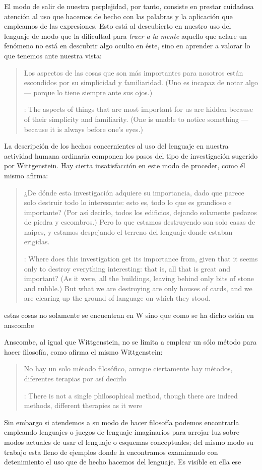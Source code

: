 El modo de salir de nuestra perplejidad, por tanto, consiste en prestar
cuidadosa atención al uso que hacemos de hecho con las palabras y la aplicación
que empleamos de las expresiones. Esto está al descubierto en nuestro uso del
lenguaje de modo que la dificultad para \emph{traer a la mente} aquello que
aclare un fenómeno no está en descubrir algo oculto en éste, sino en aprender a
valorar lo que tenemos ante nuestra vista:
\blockquote[{\cite[\S129]{wittgenstein1953phiinv}}: The aspects of things that
are most important for us are hidden because of their simplicity and
familiarity. (One is unable to notice something --- because it is always before
one's eyes.)]{Los aspectos de las cosas que son más importantes para nosotros
  están escondidos por su simplicidad y familiaridad. (Uno es incapaz de notar
  algo --- porque lo tiene siempre ante sus ojos.)}
La descripción de los hechos concernientes al uso del lenguaje en nuestra
actividad humana ordinaria componen los pasos del tipo de investigación sugerido
por Wittgenstein. Hay cierta insatisfacción en este modo de proceder, como él
mismo afirma:
\blockquote[{\cite[\S118]{wittgenstein1953phiinv}}: Where does this
investigation get its importance from, given that it seems only to destroy
everything interesting: that is, all that is great and important? (As it were,
all the buildings, leaving behind only bits of stone and rubble.) But what we
are destroying are only houses of cards, and we are clearing up the ground of
language on which they stood.]{¿De dónde esta investigación adquiere su
  importancia, dado que parece solo destruir todo lo interesante: esto es, todo
  lo que es grandioso e importante? (Por así decirlo, todos los edificios,
  dejando solamente pedazos de piedra y escombros.) Pero lo que estamos
  destruyendo son solo casas de naipes, y estamos despejando el terreno del
  lenguaje donde estaban erigidas.}


estas cosas no solamente se encuentran en W
sino que como se ha dicho están en anscombe

Anscombe, al igual que Wittgenstein, no se limita a emplear un sólo método para
hacer filosofía, como afirma el mismo Wittgenstein:

\blockquote[{\cite[\S133]{wittgenstein1953phiinv}}: There is not a single
philosophical method, though there are indeed methods, different therapies as it
were]{No hay un solo método filosófico, aunque ciertamente hay métodos,
  diferentes terapias por así decirlo}

Sin embargo si atendemos a su modo de hacer filosofía podemos encontrarla
empleando lenguajes o juegos de lenguaje imaginarios para arrojar luz sobre
modos actuales de usar el lenguaje o esquemas conceptuales; del mismo modo su
trabajo esta lleno de ejemplos donde la encontramos examinando con detenimiento
el uso que de hecho hacemos del
lenguaje.\autocite[Cf.~][228--229]{teichmann2008ans} Es visible en ella ese

